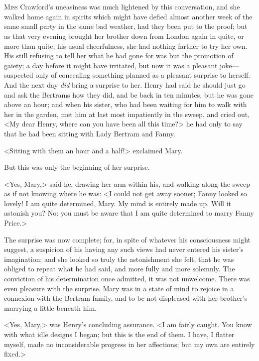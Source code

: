 \chapter[Chapter \thechapter]{} 

 \lettrine[lraise=0.3]{M}{iss} Crawford's uneasiness was much lightened by this conversation, and she walked home again in spirits which might have defied almost another week of the same small party in the same bad weather, had they been put to the proof; but as that very evening brought her brother down from London again in quite, or more than quite, his usual cheerfulness, she had nothing farther to try her own. His still refusing to tell her what he had gone for was but the promotion of gaiety; a day before it might have irritated, but now it was a pleasant joke—suspected only of concealing something planned as a pleasant surprise to herself. And the next day \textit{did}  bring a surprise to her. Henry had said he should just go and ask the Bertrams how they did, and be back in ten minutes, but he was gone above an hour; and when his sister, who had been waiting for him to walk with her in the garden, met him at last most impatiently in the sweep, and cried out, <My dear Henry, where can you have been all this time?> he had only to say that he had been sitting with Lady Bertram and Fanny.

<Sitting with them an hour and a half!> exclaimed Mary.

But this was only the beginning of her surprise.

<Yes, Mary,> said he, drawing her arm within his, and walking along the sweep as if not knowing where he was: <I could not get away sooner; Fanny looked so lovely! I am quite determined, Mary. My mind is entirely made up. Will it astonish you? No: you must be aware that I am quite determined to marry Fanny Price.>

The surprise was now complete; for, in spite of whatever his consciousness might suggest, a suspicion of his having any such views had never entered his sister's imagination; and she looked so truly the astonishment she felt, that he was obliged to repeat what he had said, and more fully and more solemnly. The conviction of his determination once admitted, it was not unwelcome. There was even pleasure with the surprise. Mary was in a state of mind to rejoice in a connexion with the Bertram family, and to be not displeased with her brother's marrying a little beneath him.

<Yes, Mary,> was Henry's concluding assurance. <I am fairly caught. You know with what idle designs I began; but this is the end of them. I have, I flatter myself, made no inconsiderable progress in her affections; but my own are entirely fixed.>

